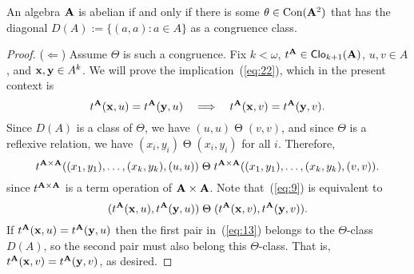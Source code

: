 \begin{lem}
 An algebra $\mathbf{A}$ is abelian if and only if there is some 
 $\theta \in \operatorname{Con} (\mathbf{A}^2)$ that has the diagonal $D(A):= \{(a,a): a \in A\}$ 
 as a congruence class.
\end{lem}
\begin{proof}
($\Leftarrow$) Assume $\Theta$ is such a congruence.  Fix 
  $k<\omega$,
  $t^{\mathbf{A}}\in \operatorname{\mathsf{Clo}}_{k+1}(\mathbf{A})$, 
  $u, v \in A$, and
  $\mathbf{x}, \mathbf{y} \in A^k$.
  We will prove the implication~(\ref{eq:22}), which in the present context is
\begin{equation*}
t^{\mathbf{A}}(\mathbf{x},u) = t^{\mathbf{A}}(\mathbf{y},u) \quad \Longrightarrow \quad 
t^{\mathbf{A}}(\mathbf{x},v) = t^{\mathbf{A}}(\mathbf{y},v).
\end{equation*}
Since $D(A)$ is a class of $\Theta$, we have 
  $(u,u) \mathrel{\Theta} (v,v)$, and since $\Theta$ is a reflexive relation, we have
  $(x_i,y_i)  \mathrel{\Theta} (x_i,y_i)$ for all $i$.  Therefore,
\begin{equation}
  \label{eq:9}  
  t^{\bA\times \bA}((x_1,y_1), \dots, (x_k,y_k), (u,u))
  \mathrel{\Theta}
  t^{\bA\times \bA}((x_1,y_1), \dots, (x_k,y_k), (v,v)).
\end{equation}
  since $t^{\mathbf{A} \times \mathbf{A}}$ is a term operation of $\mathbf{A}\times \mathbf{A}$.
  Note that~(\ref{eq:9}) is equivalent to
  \begin{equation}
    \label{eq:13}
    (t^{\bA}(\bx, u), t^{\bA}(\by,u))
    \mathrel{\Theta}
    (t^{\bA}(\bx, v), t^{\bA}(\by, v)).
  \end{equation}
  If $t^{\mathbf{A}}(\mathbf{x}, u)= t^{\mathbf{A}}(\mathbf{y}, u)$ then 
  the first pair in~(\ref{eq:13}) belongs to the $\Theta$-class
  $D(A)$, so the second pair must also belong this $\Theta$-class.
  That is, $t^{\mathbf{A}}(\mathbf{x}, v)= t^{\mathbf{A}}(\mathbf{y}, v)$, as desired.

  \smallskip


\end{proof}
